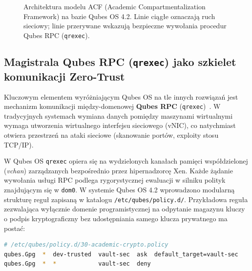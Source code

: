 \begin{figure}[htbp]
{%
}
\caption{Architektura modelu ACF (Academic Compartmentalization Framework) na bazie Qubes OS 4.2. Linie ciągłe oznaczają ruch sieciowy; linie przerywane wskazują bezpieczne wywołania procedur Qubes RPC (\texttt{qrexec}).}
\label{fig:acf_architecture}
\end{figure}

\subsection{Magistrala Qubes RPC (\texttt{qrexec}) jako szkielet komunikacji Zero-Trust}
Kluczowym elementem wyróżniającym Qubes OS na tle innych rozwiązań jest mechanizm komunikacji między-domenowej \textbf{Qubes RPC} (\texttt{qrexec})~\cite{qubes_qrexec2024}. W tradycyjnych systemach wymiana danych pomiędzy maszynami wirtualnymi wymaga utworzenia wirtualnego interfejsu sieciowego (vNIC), co natychmiast otwiera przestrzeń na ataki sieciowe (skanowanie portów, exploity stosu TCP/IP).

W Qubes OS \texttt{qrexec} opiera się na wydzielonych kanałach pamięci współdzielonej (\textit{vchan}) zarządzanych bezpośrednio przez hipernadzorcę Xen. Każde żądanie wywołania usługi RPC podlega rygorystycznej ewaluacji w silniku polityk znajdującym się w \texttt{dom0}. W systemie Qubes OS 4.2 wprowadzono modularną strukturę reguł zapisaną w katalogu \texttt{/etc/qubes/policy.d/}. Przykładowa reguła zezwalająca wyłącznie domenie programistycznej na odpytanie magazynu kluczy o podpis kryptograficzny bez udostępniania samego klucza prywatnego ma postać:
\begin{lstlisting}[language=bash, caption={Konfiguracja polityki Qubes RPC dla usługi Split-GPG w systemie Qubes OS 4.2.}]
# /etc/qubes/policy.d/30-academic-crypto.policy
qubes.Gpg  *  dev-trusted  vault-sec  ask  default_target=vault-sec
qubes.Gpg  *  *            vault-sec  deny
\end{lstlisting}

